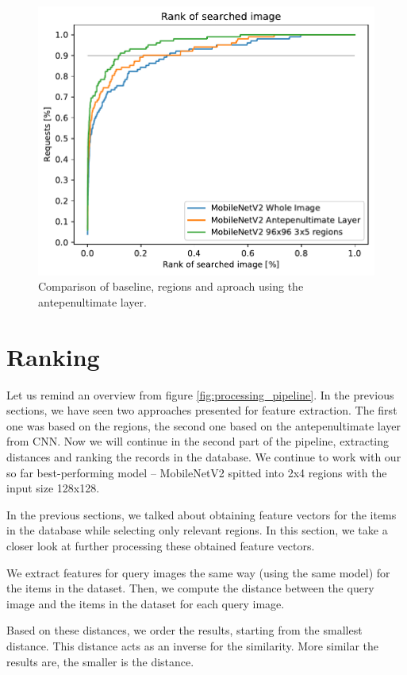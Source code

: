 \begin{figure}
    \centering
    \includegraphics[width=0.8\linewidth]{graphs/adaf8d435bb40406f9ce40654ec396e04453ab76cf0776d2a87d385055d5424f.pdf}
    \caption{Comparison of baseline, regions and aproach using the antepenultimate layer.}
    \label{fig:antepenultimate}
\end{figure}

\section{Ranking}

Let us remind an overview from figure \ref{fig:processing_pipeline}. In the previous sections, we have seen two approaches presented for feature extraction. The first one was based on the regions, the second one based on the antepenultimate layer from CNN. Now we will continue in the second part of the pipeline, extracting distances and ranking the records in the database. We continue to work with our so far best-performing model -- MobileNetV2 spitted into 2x4 regions with the input size 128x128.

In the previous sections, we talked about obtaining feature vectors for the items in the database while selecting only relevant regions. In this section, we take a closer look at further processing these obtained feature vectors.

We extract features for query images the same way (using the same model) for the items in the dataset. Then, we compute the distance between the query image and the items in the dataset for each query image.

Based on these distances, we order the results, starting from the smallest distance. This distance acts as an inverse for the similarity. More similar the results are, the smaller is the distance.

